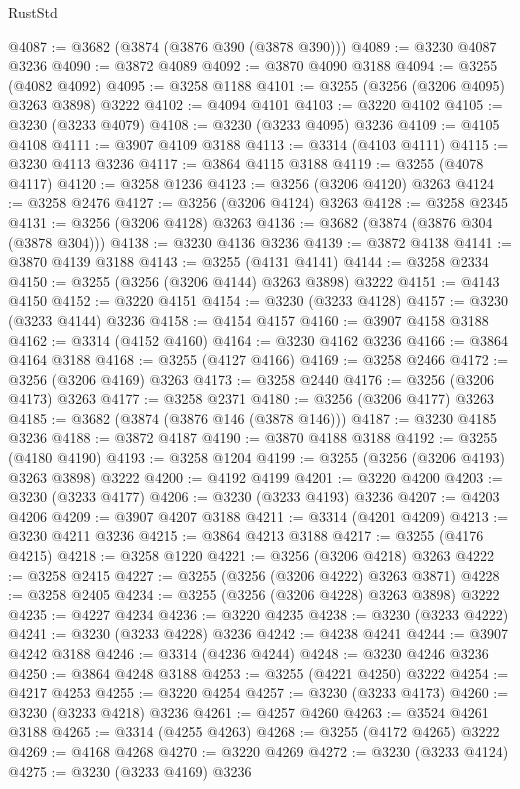 \begin{lexlean}{RustStd}
\begin{coremodule}
@4087 := @3682 (@3874 (@3876 @390 (@3878 @390)))
@4089 := @3230 @4087 @3236
@4090 := @3872 @4089
@4092 := @3870 @4090 @3188
@4094 := @3255 (@4082 @4092)
@4095 := @3258 @1188
@4101 := @3255 (@3256 (@3206 @4095) @3263 @3898) @3222
@4102 := @4094 @4101
@4103 := @3220 @4102
@4105 := @3230 (@3233 @4079)
@4108 := @3230 (@3233 @4095) @3236
@4109 := @4105 @4108
@4111 := @3907 @4109 @3188
@4113 := @3314 (@4103 @4111)
@4115 := @3230 @4113 @3236
@4117 := @3864 @4115 @3188
@4119 := @3255 (@4078 @4117)
@4120 := @3258 @1236
@4123 := @3256 (@3206 @4120) @3263
@4124 := @3258 @2476
@4127 := @3256 (@3206 @4124) @3263
@4128 := @3258 @2345
@4131 := @3256 (@3206 @4128) @3263
@4136 := @3682 (@3874 (@3876 @304 (@3878 @304)))
@4138 := @3230 @4136 @3236
@4139 := @3872 @4138
@4141 := @3870 @4139 @3188
@4143 := @3255 (@4131 @4141)
@4144 := @3258 @2334
@4150 := @3255 (@3256 (@3206 @4144) @3263 @3898) @3222
@4151 := @4143 @4150
@4152 := @3220 @4151
@4154 := @3230 (@3233 @4128)
@4157 := @3230 (@3233 @4144) @3236
@4158 := @4154 @4157
@4160 := @3907 @4158 @3188
@4162 := @3314 (@4152 @4160)
@4164 := @3230 @4162 @3236
@4166 := @3864 @4164 @3188
@4168 := @3255 (@4127 @4166)
@4169 := @3258 @2466
@4172 := @3256 (@3206 @4169) @3263
@4173 := @3258 @2440
@4176 := @3256 (@3206 @4173) @3263
@4177 := @3258 @2371
@4180 := @3256 (@3206 @4177) @3263
@4185 := @3682 (@3874 (@3876 @146 (@3878 @146)))
@4187 := @3230 @4185 @3236
@4188 := @3872 @4187
@4190 := @3870 @4188 @3188
@4192 := @3255 (@4180 @4190)
@4193 := @3258 @1204
@4199 := @3255 (@3256 (@3206 @4193) @3263 @3898) @3222
@4200 := @4192 @4199
@4201 := @3220 @4200
@4203 := @3230 (@3233 @4177)
@4206 := @3230 (@3233 @4193) @3236
@4207 := @4203 @4206
@4209 := @3907 @4207 @3188
@4211 := @3314 (@4201 @4209)
@4213 := @3230 @4211 @3236
@4215 := @3864 @4213 @3188
@4217 := @3255 (@4176 @4215)
@4218 := @3258 @1220
@4221 := @3256 (@3206 @4218) @3263
@4222 := @3258 @2415
@4227 := @3255 (@3256 (@3206 @4222) @3263 @3871)
@4228 := @3258 @2405
@4234 := @3255 (@3256 (@3206 @4228) @3263 @3898) @3222
@4235 := @4227 @4234
@4236 := @3220 @4235
@4238 := @3230 (@3233 @4222)
@4241 := @3230 (@3233 @4228) @3236
@4242 := @4238 @4241
@4244 := @3907 @4242 @3188
@4246 := @3314 (@4236 @4244)
@4248 := @3230 @4246 @3236
@4250 := @3864 @4248 @3188
@4253 := @3255 (@4221 @4250) @3222
@4254 := @4217 @4253
@4255 := @3220 @4254
@4257 := @3230 (@3233 @4173)
@4260 := @3230 (@3233 @4218) @3236
@4261 := @4257 @4260
@4263 := @3524 @4261 @3188
@4265 := @3314 (@4255 @4263)
@4268 := @3255 (@4172 @4265) @3222
@4269 := @4168 @4268
@4270 := @3220 @4269
@4272 := @3230 (@3233 @4124)
@4275 := @3230 (@3233 @4169) @3236

\end{coremodule}
\end{lexlean}
